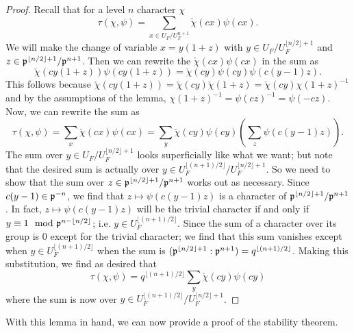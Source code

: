 \begin{proof}
  Recall that for a level $n$ character $\chi$
  \[\tau(\chi, \psi) = \sum_{x \in U_F/U_F^{n+1}} \check{\chi}(cx) \psi(cx).\]
  We will make the change of variable $x = y(1+z)$ with $y \in U_F/U_F^{\lfloor n/2 \rfloor + 1}$ and $z \in \mathfrak{p}^{\lfloor n/2 \rfloor + 1}/\mathfrak{p}^{n+1}$. Then we can rewrite the $\check{\chi}(cx) \psi(cx)$ in the sum as
  \[\check{\chi}(cy(1+z))\psi(cy(1+z)) = \check{\chi}(cy)\psi(cy) \psi(c(y-1)z).\]
  This follows because $\check{\chi}(cy(1+z)) = \check{\chi}(cy) \check{\chi}(1+z) = \check{\chi}(cy)\chi(1+z)^{-1}$ and by the assumptions of the lemma, $\chi(1+z)^{-1} = \psi(cz)^{-1} = \psi(-cz)$.
  Now, we can rewrite the sum as
  \[\tau(\chi, \psi) = \sum_x \check{\chi}(cx) \psi(cx) = \sum_y \check{\chi}(cy) \psi(cy)\left( \sum_z \psi(c(y-1)z)\right).\]
  The sum over $y \in U_F/U_F^{\lfloor n/2 \rfloor +1}$ looks superficially like what we want; but note that the desired sum is actually over $y \in U_F^{\lfloor (n+1)/2 \rfloor} /U_F^{\lfloor n/2 \rfloor +1}$.
  So we need to show that the sum over $z \in \mathfrak{p}^{\lfloor n/2 \rfloor +1} / \mathfrak{p}^{n+1}$ works out as necessary.
  Since $c(y-1) \in \mathfrak{p}^{-n}$, we find that $z \mapsto \psi(c(y-1)z)$ is a character of $\mathfrak{p}^{\lfloor n/2 \rfloor +1}/\mathfrak{p}^{n+1}$.
  In fact, $z \mapsto \psi(c(y-1)z)$ will be the trivial character if and only if $y \equiv 1 \mod {\mathfrak{p}}^{n - \lfloor n/2 \rfloor}$; i.e. $y \in U_F^{\lfloor (n+1)/2\rfloor}$.
  Since the sum of a character over its group is $0$ except for the trivial character; we find that this sum vanishes except when $y \in U_F^{\lfloor (n+1)/2 \rfloor}$ when the sum is $(\mathfrak{p}^{\lfloor n/2 \rfloor +1} : \mathfrak{p}^{n+1}) = q^{\lfloor (n+1)/2 \rfloor}$.
  Making this substitution, we find as desired that
  \[ \tau(\chi, \psi) = q^{\lfloor (n+1)/2\rfloor} \sum_y \check{\chi}(cy) \psi(cy) \]
  where the sum is now over $y \in U_F^{\lfloor (n+1)/2 \rfloor} /U_F^{\lfloor n/2 \rfloor +1}$.
\end{proof}

With this lemma in hand, we can now provide a proof of the stability theorem.

